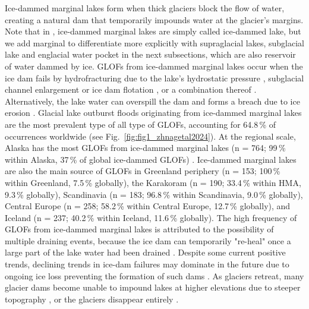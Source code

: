 Ice-dammed marginal lakes form when thick glaciers block the flow of water, creating a natural dam that temporarily impounds water at the glacier's margins. Note that in \cite{Lutzow&al2023,Zhang&al2024}, ice-dammed marginal lakes are simply called ice-dammed lake, but we add marginal to differentiate more explicitly with supraglacial lakes, subglacial lake and englacial water pocket in the next subsections, which are also reservoir of water dammed by ice. GLOFs from ice-dammed marginal lakes \citep[also called  jökulhlaups in][]{Bjornsson2010} occur when the ice dam fails by hydrofracturing due to the lake's hydrostatic pressure \citep[e.g. in][]{Lindner&al2020}, subglacial channel enlargement \citep{Nye1976} or ice dam flotation \citep[e.g. in][]{Liestol1956}, or a combination thereof \citep{Flowers&al2004}\citep[see also][for a review on the physical aspects of these mechanisms]{Flowers2015}. Alternatively, the lake water can overspill the dam and forms a breach due to ice erosion \citep[e.g.][]{Walder&Costa1996,Raymond&Nolan2000,Mayer&Schuler2005}. Glacial lake outburst floods originating from ice-dammed marginal lakes are the most prevalent type of all type of GLOFs, accounting for 64.8\,\% of occurrences worldwide (see Fig.~\ref{fig:fig1_zhnagetal2024}). At the regional scale, Alaska has the most GLOFs from ice-dammed marginal lakes (n = 764; 99\,\% within Alaska, 37\,\% of global ice-dammed GLOFs) \citep{Emmer&al2022}. Ice-dammed marginal lakes are also the main source of GLOFs in Greenland periphery (n = 153; 100\,\% within Greenland, 7.5\,\% globally), the Karakoram (n = 190; 33.4\,\% within HMA, 9.3\,\% globally), Scandinavia (n = 183; 96.8\,\% within Scandinavia, 9.0\,\% globally), Central Europe (n = 258; 58.2\,\% within Central Europe, 12.7\,\% globally), and Iceland (n = 237; 40.2\,\% within Iceland, 11.6\,\% globally)\citep{Zhang&al2024}. The high frequency of GLOFs from ice-dammed marginal lakes is attributed to the possibility of multiple draining events, because the ice dam can temporarily "re-heal" once a large part of the lake water had been drained \citep{Zhang&al2024}. Despite some current positive trends, declining trends in ice-dam failures may dominate in the future due to ongoing ice loss preventing the formation of such dams \citep{Rick&al2022}. As glaciers retreat, many glacier dams become unable to impound lakes at higher elevations due to steeper topography \citep{Zhang&al2024}, or the glaciers disappear entirely \citep[e.g.][]{Tweed&Russel1999,Geertsema&Clague2005}. %

